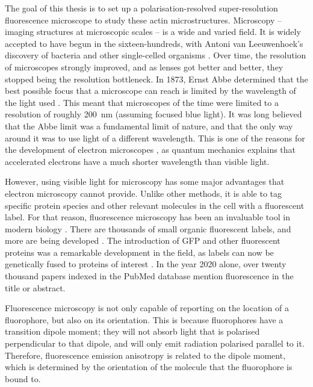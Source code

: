 The goal of this thesis is to set up a polarisation-resolved super-resolution fluorescence microscope to study these actin microstructures.	Microscopy -- imaging structures at microscopic scales -- is a wide and varied field. It is widely accepted to have begun in the sixteen-hundreds, with Antoni van Leeuwenhoek's discovery of bacteria and other single-celled organisms \cite{VanZuylen1981}. Over time, the resolution of microscopes strongly improved, and as lenses got better and better, they stopped being the resolution bottleneck. In 1873, Ernst Abbe determined that the best possible focus that a microscope can reach is limited by the wavelength of the light used \cite{Abbe1873}. This meant that microscopes of the time were limited to a resolution of roughly 200~nm (assuming focused blue light). It was long believed that the Abbe limit was a fundamental limit of nature, and that the only way around it was to use light of a different wavelength. This is one of the reasons for the development of electron microscopes \cite{Smith2008}, as quantum mechanics explains that accelerated electrons have a much shorter wavelength than visible light. 

However, using visible light for microscopy has some major advantages that electron microscopy cannot provide. Unlike other methods, it is able to tag specific protein species and other relevant molecules in the cell with a fluorescent label. For that reason, fluorescence microscopy has been an invaluable tool in modern biology \cite{Danial2016}.  There are thousands of small organic fluorescent labels, and more are being developed \cite{Zhang2002, Resch-Genger2008}. The introduction of GFP and other fluorescent proteins was a remarkable development in the field, as labels can now be genetically fused to proteins of interest \cite{Shaner2005, Matlashov2020}. In the year 2020 alone, over twenty thousand papers indexed in the PubMed database mention fluorescence in the title or abstract.

Fluorescence microscopy is not only capable of reporting on the location of a fluorophore, but also on its orientation. This is because fluorophores have a transition dipole moment; they will not absorb light that is polarised perpendicular to that dipole, and will only emit radiation polarised parallel to it. Therefore, fluorescence emission anisotropy is related to the dipole moment, which is determined by the orientation of the molecule that the fluorophore is bound to.


